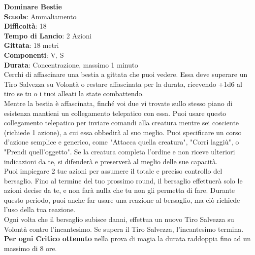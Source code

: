 \begin{multicols}{2}
\medskip\textbf{Dominare Bestie}\\
\textbf{Scuola}: Ammaliamento\\
\textbf{Difficoltà}: 18\\
\textbf{Tempo di Lancio}: 2 Azioni\\
\textbf{Gittata}: 18 metri\\
\textbf{Componenti}: V, S\\
\textbf{Durata}: Concentrazione, massimo 1 minuto\\
Cerchi di affascinare una bestia a gittata che puoi vedere. Essa deve superare un Tiro Salvezza su Volontà o restare affascinata per la durata, ricevendo +1d6 al tiro se tu o i tuoi alleati la state combattendo.\\
Mentre la bestia è affascinata, finché voi due vi trovate sullo stesso piano di esistenza mantieni un collegamento telepatico con essa. Puoi usare questo collegamento telepatico per inviare comandi alla creatura mentre sei cosciente (richiede 1 azione), a cui essa obbedirà al suo meglio. Puoi specificare un corso d'azione semplice e generico, come "Attacca quella creatura", "Corri laggiù", o "Prendi quell'oggetto". Se la creatura completa l'ordine e non riceve ulteriori indicazioni da te, si difenderà e preserverà al meglio delle sue capacità.\\
Puoi impiegare 2 tue azioni per assumere il totale e preciso controllo del bersaglio. Fino al termine del tuo prossimo round, il bersaglio effettuerà solo le azioni decise da te, e non farà nulla che tu non gli permetta di fare. Durante questo periodo, puoi anche far usare una reazione al bersaglio, ma ciò richiede l'uso della tua reazione.\\
Ogni volta che il bersaglio subisce danni, effettua un nuovo Tiro Salvezza su Volontà contro l'incantesimo. Se supera il Tiro Salvezza, l'incantesimo termina.\\
\textbf{Per ogni Critico ottenuto} nella prova di magia la durata raddoppia fino ad un massimo di 8 ore.


\end{multicols}
